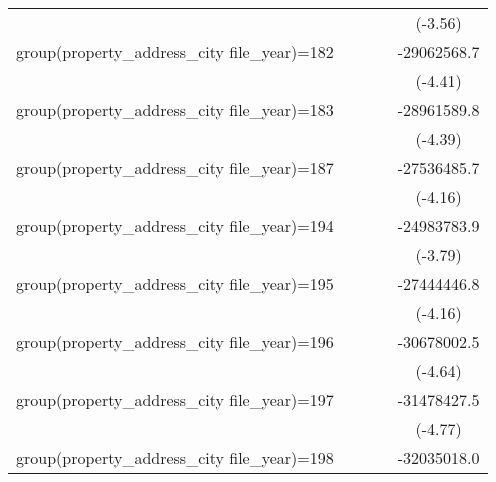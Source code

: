{\begin{tabular}{l*{4}{c}}
                    &                     &                     &                     &     (-3.56)         \\
\addlinespace
group(property\_address\_city file\_year)=182&                     &                     &                     & -29062568.7\sym{***}\\
                    &                     &                     &                     &     (-4.41)         \\
\addlinespace
group(property\_address\_city file\_year)=183&                     &                     &                     & -28961589.8\sym{***}\\
                    &                     &                     &                     &     (-4.39)         \\
\addlinespace
group(property\_address\_city file\_year)=187&                     &                     &                     & -27536485.7\sym{***}\\
                    &                     &                     &                     &     (-4.16)         \\
\addlinespace
group(property\_address\_city file\_year)=194&                     &                     &                     & -24983783.9\sym{***}\\
                    &                     &                     &                     &     (-3.79)         \\
\addlinespace
group(property\_address\_city file\_year)=195&                     &                     &                     & -27444446.8\sym{***}\\
                    &                     &                     &                     &     (-4.16)         \\
\addlinespace
group(property\_address\_city file\_year)=196&                     &                     &                     & -30678002.5\sym{***}\\
                    &                     &                     &                     &     (-4.64)         \\
\addlinespace
group(property\_address\_city file\_year)=197&                     &                     &                     & -31478427.5\sym{***}\\
                    &                     &                     &                     &     (-4.77)         \\
\addlinespace
group(property\_address\_city file\_year)=198&                     &                     &                     & -32035018.0\sym{***}\\

\end{tabular}}
